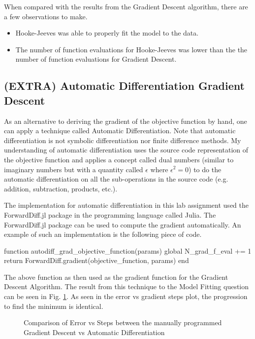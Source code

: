 \documentclass{article}
\begin{document}
    When compared with the results from the Gradient Descent algorithm, there are a few observations to make.
    \begin{itemize}
        \item Hooke-Jeeves was able to properly fit the model to the data.
        \item The number of function evaluations for Hooke-Jeeves was lower than the the number of function evaluations for Gradient Descent.
    \end{itemize}

    \subsection{(EXTRA) Automatic Differentiation Gradient Descent}

    As an alternative to deriving the gradient of the objective function by hand, one can apply a technique called Automatic Differentiation. Note that automatic differentiation is not symbolic differentiation nor finite difference methods. My understanding of automatic differentiation uses the source code representation of the objective function and applies a concept called dual numbers (similar to imaginary numbers but with a quantity called $\epsilon$ where $\epsilon^2 = 0$) to do the automatic differentiation on all the sub-operations in the source code (e.g. addition, subtraction, products, etc.).

    The implementation for automatic differentiation in this lab assignment used the ForwardDiff.jl package in the programming language called Julia. The ForwardDiff.jl package can be used to compute the gradient automatically. An example of such an implementation is the following piece of code.

    \begin{jllisting}
        function autodiff_grad_objective_function(params)
            global N_grad_f_eval += 1
            return ForwardDiff.gradient(objective_function, params)
        end
    \end{jllisting}

    The above function as then used as the gradient function for the Gradient Descent Algorithm. The result from this technique to the Model Fitting question can be seen in Fig. \ref{fig:Q3_AutoDiff}. As seen in the error vs gradient steps plot, the progression to find the minimum is identical.

    \begin{figure}[H]
        \centering
        
        \caption{Comparison of Error vs Steps between the manually programmed Gradient Descent vs Automatic Differentiation}
        \label{fig:Q3_AutoDiff}
    \end{figure}
\end{document}
